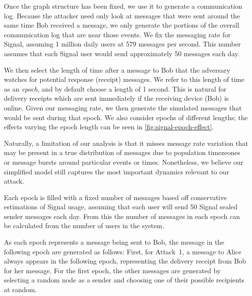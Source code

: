 Once the graph structure has been fixed, we use it to generate a communication
log. Because the attacker need only look at messages that were sent around the
same time Bob received a message, we only generate the portions of the overall
communication log that are near those events.  We fix the messaging rate for
Signal, assuming 1 million daily users at 579 messages per second. This number
assumes that each Signal user would send approximately 50 messages each day.

We then select the length of time after a message to Bob that the adversary
watches for potential response (receipt) messages. We refer to this length of
time as an \emph{epoch}, and by default choose a length of 1 second. This is
natural for delivery receipts which are sent immediately if the receiving device
(Bob) is online. Given our messaging rate, we then generate the simulated
messages that would be sent during that epoch. We also consider epochs of
different lengths; the effects varying the epoch length can be seen in
\cref{fig:signal-epoch-effect}.


Naturally, a limitation of our analysis is that it misses message rate
variation that may be present in a true distribution of messages due to
population timezeones or message bursts around particular events or times.
Nonetheless, we believe our simplified model still captures the most important
dynamics relevant to our attack.

\EpochEffect

Each epoch is filled with a fixed number of messages based off conservative
estimations of Signal usage, assuming that each user will send 50 Signal sealed
sender messages each day. From this the number of messages in each epoch can be
calculated from the number of users in the system.

As each epoch represents a message being sent to Bob, the message in the
following epoch are generated as follows: First, for Attack~1, a message to
Alice always appears in the following epoch, representing the delivery receipt
from Bob for her message. For the first epoch, the other messages are generated
by selecting a random node as a sender and choosing one of their possible
recipients at random.

\PercentageEffect


